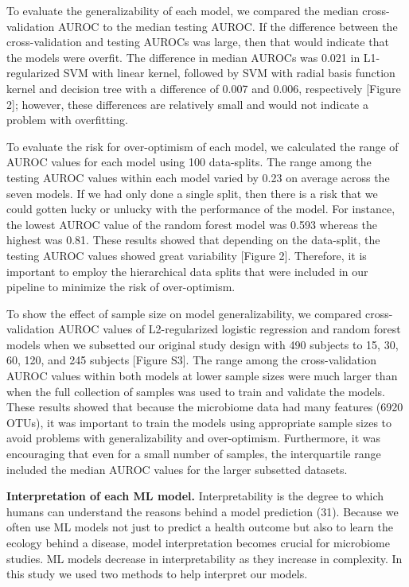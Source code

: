 \documentclass[11pt,]{article}
\begin{document}
To evaluate the generalizability of each model, we compared the median
cross-validation AUROC to the median testing AUROC. If the difference
between the cross-validation and testing AUROCs was large, then that
would indicate that the models were overfit. The difference in median
AUROCs was 0.021 in L1-regularized SVM with linear kernel, followed by
SVM with radial basis function kernel and decision tree with a
difference of 0.007 and 0.006, respectively {[}Figure 2{]}; however,
these differences are relatively small and would not indicate a problem
with overfitting.

To evaluate the risk for over-optimism of each model, we calculated the
range of AUROC values for each model using 100 data-splits. The range
among the testing AUROC values within each model varied by 0.23 on
average across the seven models. If we had only done a single split,
then there is a risk that we could gotten lucky or unlucky with the
performance of the model. For instance, the lowest AUROC value of the
random forest model was 0.593 whereas the highest was 0.81. These
results showed that depending on the data-split, the testing AUROC
values showed great variability {[}Figure 2{]}. Therefore, it is
important to employ the hierarchical data splits that were included in
our pipeline to minimize the risk of over-optimism.

To show the effect of sample size on model generalizability, we compared
cross-validation AUROC values of L2-regularized logistic regression and
random forest models when we subsetted our original study design with
490 subjects to 15, 30, 60, 120, and 245 subjects {[}Figure S3{]}. The
range among the cross-validation AUROC values within both models at
lower sample sizes were much larger than when the full collection of
samples was used to train and validate the models. These results showed
that because the microbiome data had many features (6920 OTUs), it was
important to train the models using appropriate sample sizes to avoid
problems with generalizability and over-optimism. Furthermore, it was
encouraging that even for a small number of samples, the interquartile
range included the median AUROC values for the larger subsetted
datasets.

\textbf{Interpretation of each ML model.} Interpretability is the degree
to which humans can understand the reasons behind a model prediction
(31). Because we often use ML models not just to predict a health
outcome but also to learn the ecology behind a disease, model
interpretation becomes crucial for microbiome studies. ML models
decrease in interpretability as they increase in complexity. In this
study we used two methods to help interpret our models.
\end{document}
